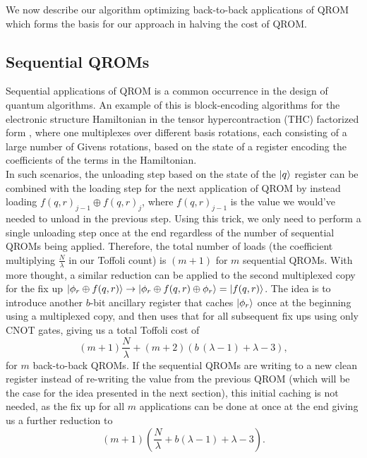 \documentclass[a4paper, amsfonts, amssymb, amsmath, reprint, showkeys, twoside,superscriptaddress, onecolumn, nofootinbib]{revtex4-2}
\begin{document}
\noindent We now describe our algorithm optimizing back-to-back applications of QROM which forms the basis for our approach in halving the cost of QROM.


\subsection{Sequential QROMs}
Sequential applications of QROM is a common occurrence in the design of quantum algorithms. An example of this is block-encoding algorithms for the electronic structure Hamiltonian in the tensor hypercontraction (THC) factorized form \cite{lee2021even}, where one multiplexes over different basis rotations, each consisting of a large number of Givens rotations, based on the state of a register encoding the coefficients of the terms in the Hamiltonian.\\

In such scenarios, the unloading step based on the state of the $\ket{q}$ register can be combined with the loading step for the next application of QROM by instead loading $f(q,r)_{j-1} \oplus f(q,r)_{j}$, where $f(q,r)_{j-1}$ is the value we would've needed to unload in the previous step. Using this trick, we only need to perform a single unloading step once at the end regardless of the number of sequential QROMs being applied. Therefore, the total number of loads (the coefficient multiplying $\frac{N}{\lambda}$ in our Toffoli count) is $(m+1)$ for $m$ sequential QROMs. With more thought, a similar reduction can be applied to the second multiplexed copy for the fix up $\ket{\phi_r \oplus f(q,r)} \to \ket{\phi_r \oplus f(q,r)\oplus \phi_r}=\ket{f(q,r)}$. The idea is to introduce another $b$-bit ancillary register that caches $\ket{\phi_r}$ once at the beginning using a multiplexed copy, and then uses that for all subsequent fix ups using only CNOT gates, giving us a total Toffoli cost of
\begin{equation}
    (m+1)\frac{N}{\lambda} + (m+2)\left(b\,(\lambda-1)+\lambda-3\right),
\end{equation}
for $m$ back-to-back QROMs. If the sequential QROMs are writing to a new clean register instead of re-writing the value from the previous QROM (which will be the case for the idea presented in the next section), this initial caching is not needed, as the fix up for all $m$ applications can be done at once at the end giving us a further reduction to
\begin{equation}\label{eq:sequential}
    (m+1)\left(\frac{N}{\lambda} + b(\lambda - 1) +\lambda-3\right).
\end{equation}
\end{document}
